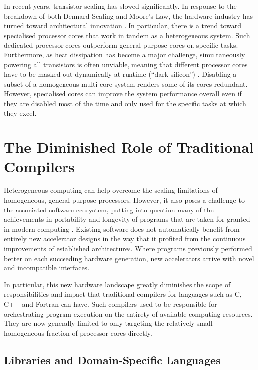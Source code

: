     In recent years, transistor scaling has slowed significantly.
    In response to the breakdown of both Dennard Scaling and Moore's Law, the
    hardware industry has turned toward architectural innovation
    \citep{7878935}.
    In particular, there is a trend toward specialised processor cores that work
    in tandem as a heterogeneous system.
    Such dedicated processor cores outperform general-purpose cores on
    specific tasks.
    Furthermore, as heat dissipation has become a major challenge,
    simultaneously powering all transistors is often unviable, meaning that
    different processor cores have to be masked out dynamically at runtime
    (``dark silicon'') \citep{6307773}.
    Disabling a subset of a homogeneous multi-core system renders some of its
    cores redundant.
    However, specialised cores can improve the system performance overall even
    if they are disabled most of the time and only used for the specific tasks
    at which they excel.

\section{The Diminished Role of Traditional Compilers}

    Heterogeneous computing can help overcome the scaling limitations of
    homogeneous, general-purpose processors.
    However, it also poses a challenge to the associated software ecosystem,
    putting into question many of the achievements in portability and longevity
    of programs that are taken for granted in modern computing \citep{8719512}.
    Existing software does not automatically benefit from entirely new
    accelerator designs in the way that it profited from the continuous
    improvements of established architectures.
    Where programs previously performed better on each succeeding hardware
    generation, new accelerators arrive with novel and incompatible interfaces.

    In particular, this new hardware landscape greatly diminishes the scope of
    responsibilities and impact that traditional compilers for languages such as
    C, C++ and Fortran can have.
    Such compilers used to be responsible for orchestrating
    program execution on the entirety of available computing resources.
    They are now generally limited to only targeting the relatively small
    homogeneous fraction of processor cores directly.

\subsection{Libraries and Domain-Specific Languages}

